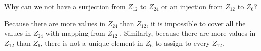 \question Why can we not have a surjection from $Z_{12}$ to $Z_{24}$ 
or an injection from  $Z_{12}$ to $Z_{6}$?

\begin{solution}
Because there are more values in $Z_{24}$ than $Z_{12}$, it is 
impossible to cover all the values in $Z_{24}$ with mapping from 
$Z_{12}$ . Similarly, because there are more values in $Z_{12}$ than 
$Z_{6}$, there is not a unique element in $Z_{6}$ to assign to every 
$Z_{12}$.
\end{solution}

\clearpage